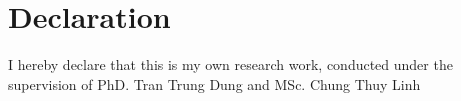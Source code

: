 \chapter*{Declaration}

I hereby declare that this is my own research work, conducted under the supervision of PhD. Tran Trung Dung and MSc. Chung Thuy Linh